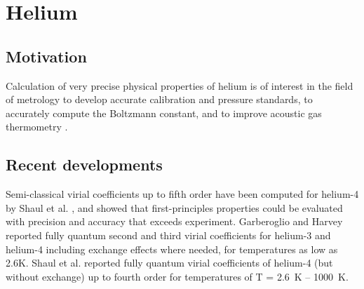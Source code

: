 \chapter{Helium}
\section{Motivation}
    Calculation of very precise physical properties of helium is of interest in the field of metrology to develop accurate calibration and pressure standards, to accurately compute the Boltzmann constant, and to improve acoustic gas thermometry  \cite{Garberoglio2009,Fellmuth2006,Schmidt2007,Pitre2006,Moldover2010,Aziz1995}. 
\section{Recent developments}
    Semi-classical virial coefficients up to fifth order have been computed for helium-4 by Shaul et al. \cite{Shaul2012SC}, and showed that first-principles properties could be evaluated with precision and accuracy that exceeds experiment. Garberoglio and Harvey \cite{Garberoglio2009,Garberoglio2011,Garberoglio2011b} reported fully quantum second and third virial coefficients for helium-3 and helium-4 including exchange effects where needed, for temperatures as low as 2.6K. Shaul et al. \cite{Shaul2012} reported fully quantum virial coefficients of helium-4 (but without exchange) up to fourth order for temperatures of T = 2.6~K -- 1000~K.
